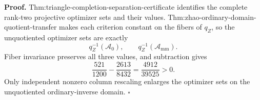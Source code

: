 \textbf{Proof.}
Thm:triangle-completion-separation-certificate identifies the complete rank-two projective optimizer sets and their values.  Thm:zhao-ordinary-domain-quotient-transfer makes each criterion constant on the fibers of \(q_Z\), so the unquotiented optimizer sets are exactly
\[
q_Z^{-1}(\mathcal A_0),
\qquad q_Z^{-1}(\mathcal A_{\mathrm{mm}}).
\]
Fiber invariance preserves all three values, and subtraction gives
\[
\frac{521}{1200}-\frac{2613}{8432}=\frac{4912}{39525}>0.
\]
Only independent nonzero column rescaling enlarges the optimizer sets on the unquotiented ordinary-inverse domain. \(\square\)